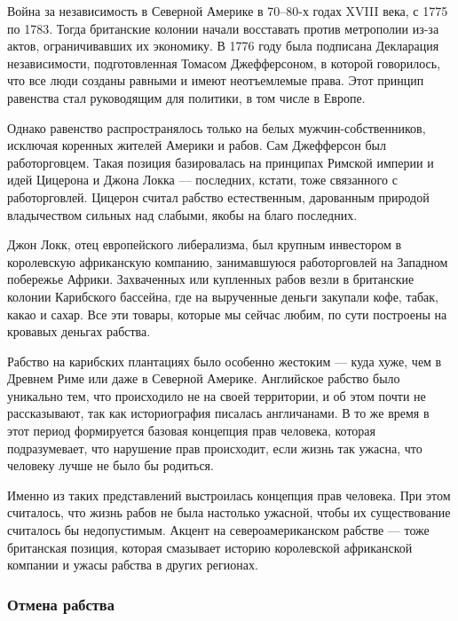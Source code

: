 Война за независимость в Северной Америке в 70–80-х годах XVIII века, с 1775 по 1783. Тогда британские колонии начали восставать против метрополии из-за актов, ограничивавших их экономику. В 1776 году была подписана Декларация независимости, подготовленная Томасом Джефферсоном, в которой говорилось, что все люди созданы равными и имеют неотъемлемые права. Этот принцип равенства стал руководящим для политики, в том числе в Европе.

Однако равенство распространялось только на белых мужчин-собственников, исключая коренных жителей Америки и рабов. Сам Джефферсон был работорговцем. Такая позиция базировалась на принципах Римской империи и идей Цицерона и Джона Локка --- последних, кстати, тоже связанного с работорговлей. Цицерон считал рабство естественным, дарованным природой владычеством сильных над слабыми, якобы на благо последних.

Джон Локк, отец европейского либерализма, был крупным инвестором в королевскую африканскую компанию, занимавшуюся работорговлей на Западном побережье Африки. Захваченных или купленных рабов везли в британские колонии Карибского бассейна, где на вырученные деньги закупали кофе, табак, какао и сахар. Все эти товары, которые мы сейчас любим, по сути построены на кровавых деньгах рабства.

Рабство на карибских плантациях было особенно жестоким --- куда хуже, чем в Древнем Риме или даже в Северной Америке. Английское рабство было уникально тем, что происходило не на своей территории, и об этом почти не рассказывают, так как историография писалась англичанами. В то же время в этот период формируется базовая концепция прав человека, которая подразумевает, что нарушение прав происходит, если жизнь так ужасна, что человеку лучше не было бы родиться.

Именно из таких представлений выстроилась концепция прав человека. При этом считалось, что жизнь рабов не была настолько ужасной, чтобы их существование считалось бы недопустимым. Акцент на североамериканском рабстве --- тоже британская позиция, которая смазывает историю королевской африканской компании и ужасы рабства в других регионах.

\subsubsection{Отмена рабства}

